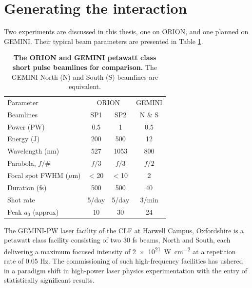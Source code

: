 \section{Generating the interaction}
Two experiments are discussed in this thesis, one on ORION, and one planned on GEMINI. Their typical beam parameters are presented in Table \ref{tab:laser_params}.
\begin{table}[]
	\centering
	\begin{tabular}{lccc}
		\hline \hline
		Parameter                & \multicolumn{2}{c}{ORION} & GEMINI \\ 
		Beamlines                & SP1         & SP2         & N \& S  \\ \hline
		Power (PW)               & 0.5         & 1           & 0.5    \\
		Energy (J)               & 200         & 500         & 12     \\
		Wavelength (nm)          & 527         & 1053        & 800    \\
		Parabola, $f/\#$ & $f/3$        & $f/3$        & $f/2$      \\
		Focal spot FWHM ($\mu$m) & < 20        & < 10        & 2      \\
		Duration (fs)            & 500         & 500         & 40     \\
		Shot rate                & 5/day       & 5/day       & 3/min  \\
		Peak $a_0$ (approx)      & 10          & 30          & 24    \\ \hline \hline
	\end{tabular}
	\caption{\textbf{The ORION and GEMINI petawatt class short pulse beamlines for comparison.} The GEMINI North (N) and South (S) beamlines are equivalent.}
	\label{tab:laser_params}
\end{table}
The GEMINI-PW laser facility of the \ac{CLF} at Harwell Campus, Oxfordshire is a petawatt class facility consisting of two 30 fs beams, North and South, each delivering a maximum focused intensity of \qty{2e21}{W.cm^{-2}} at a repetition rate of 0.05 Hz. The commissioning of such high-frequency facilities has ushered in a paradigm shift in high-power laser physics experimentation with the entry of statistically significant results.

